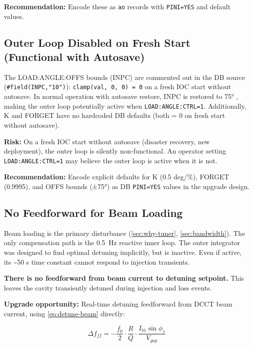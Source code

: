 \textbf{Recommendation:} Encode these as \texttt{ao} records with \texttt{PINI=YES} and default values.

\subsection{Outer Loop Disabled on Fresh Start (Functional with Autosave)}\label{sec:gap-outer-disabled}


The LOAD:ANGLE:OFFS bounds (INPC) are commented out in the DB source (\texttt{\#field(INPC,\allowbreak{}"10")}): \texttt{clamp(val,\allowbreak{}\ 0,\allowbreak{}\ 0)\ =\allowbreak{}\ 0} on a fresh IOC start without autosave. In normal operation with autosave restore, INPC is restored to 75° , making the outer loop potentially active when \texttt{LOAD:\allowbreak{}ANGLE:\allowbreak{}CTRL=\allowbreak{}1}. Additionally, K and FORGET have no hardcoded DB defaults (both = 0 on fresh start without autosave).

\textbf{Risk:} On a fresh IOC start without autosave (disaster recovery, new deployment), the outer loop is silently non-functional. An operator setting \texttt{LOAD:\allowbreak{}ANGLE:\allowbreak{}CTRL=\allowbreak{}1} may believe the outer loop is active when it is not.

\textbf{Recommendation:} Encode explicit defaults for K (0.5 deg/\%), FORGET (0.9995), and OFFS bounds (±75°) as DB \texttt{PINI=YES} values in the upgrade design.

\subsection{No Feedforward for Beam Loading}\label{sec:gap-feedforward}


Beam loading is the primary disturbance (\cref{sec:why-tuner}, \cref{sec:bandwidth}). The only compensation path is the \qty{0.5}{\hertz} reactive inner loop. The outer integrator was designed to find optimal detuning implicitly, but is inactive. Even if active, its \textasciitilde50 s time constant cannot respond to injection transients.

\textbf{There is no feedforward from beam current to detuning setpoint.} This leaves the cavity transiently detuned during injection and loss events.

\textbf{Upgrade opportunity:} Real-time detuning feedforward from DCCT beam current, using \cref{eq:detune-beam} directly:

\begin{equation}\label{eq:feedforward}
  \Delta f_{ff} = -\frac{f_0}{2}\cdot\frac{R}{Q}\cdot\frac{I_{b1}\sin\phi_s}{V_{gap}}
\end{equation}


